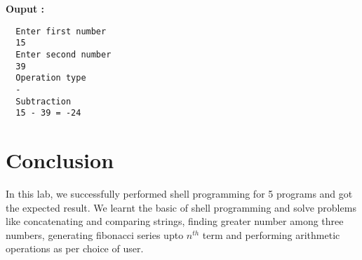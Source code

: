 \documentclass[journal,onecolumn]{IEEEtran}
\begin{document}
\textbf{Ouput : }
\begin{verbatim}
  Enter first number
  15
  Enter second number
  39
  Operation type
  -
  Subtraction
  15 - 39 = -24
\end{verbatim}














\section{Conclusion}
In this lab, we successfully performed shell programming for 5 programs and got the expected result. We learnt the basic of shell programming and solve problems like concatenating and comparing strings, finding greater number among three numbers, generating fibonacci series upto $n^{th}$ term and performing arithmetic operations as per choice of user.
\end{document}
